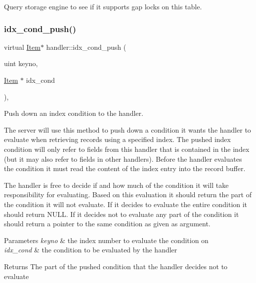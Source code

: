 Query storage engine to see if it supports gap locks on this table. \mbox{\label{classhandler_a0bb554282443af443fc8aae4533e1407}} 
\subsubsection{\texorpdfstring{idx\+\_\+cond\+\_\+push()}{idx\_cond\_push()}}
{\footnotesize\ttfamily virtual \mbox{\hyperlink{classItem}{Item}}$\ast$ handler\+::idx\+\_\+cond\+\_\+push (\begin{DoxyParamCaption}\item[{uint}]{keyno,  }\item[{\mbox{\hyperlink{classItem}{Item}} $\ast$}]{idx\+\_\+cond }\end{DoxyParamCaption})\hspace{0.3cm}{\ttfamily [inline]}, {\ttfamily [virtual]}}

Push down an index condition to the handler.

The server will use this method to push down a condition it wants the handler to evaluate when retrieving records using a specified index. The pushed index condition will only refer to fields from this handler that is contained in the index (but it may also refer to fields in other handlers). Before the handler evaluates the condition it must read the content of the index entry into the record buffer.

The handler is free to decide if and how much of the condition it will take responsibility for evaluating. Based on this evaluation it should return the part of the condition it will not evaluate. If it decides to evaluate the entire condition it should return N\+U\+LL. If it decides not to evaluate any part of the condition it should return a pointer to the same condition as given as argument.


\begin{DoxyParams}{Parameters}
{\em keyno} & the index number to evaluate the condition on \\
\hline
{\em idx\+\_\+cond} & the condition to be evaluated by the handler\\
\hline
\end{DoxyParams}
\begin{DoxyReturn}{Returns}
The part of the pushed condition that the handler decides not to evaluate 
\end{DoxyReturn}
\mbox{\label{classhandler_af37bd518c53c966459632584c34855d0}} 
